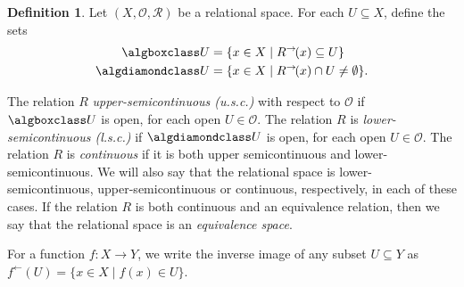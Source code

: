 \documentclass{article}[a4paper]
\theoremstyle{definition}
\newtheorem{definition}{Definition}%
\newcommand{\Ocal}{\mathcal{O}} %
\newcommand{\invim}{^{\leftarrow}} %
\newcommand{\dirim}{^{\rightarrow\!}}
\begin{document}
\begin{definition}
\label{definition:classicalOperators}
    Let $(X, \Ocal , \mathcal{R})$ be a relational space. For each $U \subseteq X$, define the sets
    \begin{align*}
        \algboxclass U &= \{ x \in X \mid R\dirim(x) \subseteq U \} \\
        \algdiamondclass U &= \{ x \in X \mid R\dirim(x) \cap U \neq \emptyset \} . 
    \end{align*}

    The relation $R$ \emph{upper-semicontinuous (u.s.c.)} with respect to $\Ocal$ if $\algboxclass U$ is open, for each open $U \in \Ocal$. The relation $R$ is \emph{lower-semicontinuous (l.s.c.)} if $\algdiamondclass U$ is open, for each open $U \in \Ocal$. The relation $R$ is \emph{continuous} if it is both upper semicontinuous and lower-semicontinuous. We will also say that the relational space is lower-semicontinuous, upper-semicontinuous or continuous, respectively, in each of these cases. If the relation $R$ is both continuous and an equivalence relation, then we say that the relational space is an \emph{equivalence space}.
\end{definition}

For a function $f : X \longrightarrow Y$, we write the inverse image of any subset $U \subseteq Y$ as $f\invim (U) = \{ x\in X \mid f(x) \in U \}$. 
\end{document}

